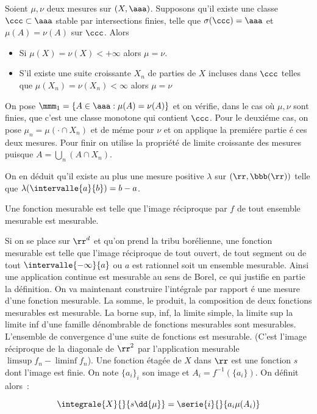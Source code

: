 \theoreme{} Soient $\mu,\nu$ deux mesures sur $(X,\aaa)$. Supposons qu'il existe une classe $\ccc\subset \aaa$ stable par
intersections finies, telle que $\sigma(\ccc) = \aaa$ et $\mu(A) = \nu(A)$ sur $\ccc$. Alors
\begin{itemize}
\item{} Si $\mu(X) = \nu(X)< +\infty$ alors $\mu = \nu$.
\item{} S'il existe une suite croissante $X_n$ de parties de $X$ incluses dans $\ccc$ telles que $\mu(X_n) = \nu(X_n)<\infty$ alors
$\mu = \nu$
\end{itemize}
\dem On pose $\mmm_1 = \lbrace A\in \aaa : \mu(A) = \nu(A)\rbrace$ et on vérifie, dans le cas o\`u $\mu,\nu$ sont finies, que c'est
une classe monotone qui contient $\ccc$. Pour le deuxiéme cas, on pose $\mu_n = \mu(\cdot\cap X_n)$ et de méme pour $\nu$ et on 
applique la premiére partie é ces deux mesures. Pour finir on utilise la propriété de limite croissante des mesures puisque $A = 
\bigcup_n (A\cap X_n)$.\par
On en déduit qu'il existe au plus une mesure positive $\lambda$ sur $(\rr, \bbb(\rr))$ telle que $\lambda(\intervalle{a}{b}) = b-a$.\par
{} Une fonction mesurable est telle que l'image réciproque par $f$ de tout ensemble
mesurable est mesurable.\par
Si on se place sur ${\rr}^{d}$ et qu'on prend la tribu borélienne, une fonction mesurable est telle que l'image
réciproque de tout ouvert, de tout segment ou de tout $\intervalle{-\infty}{a}$ ou $a$ est rationnel soit un 
ensemble mesurable. Ainsi une application continue est mesurable au sens de Borel, ce qui justifie en partie 
la définition. On va maintenant construire l'intégrale par rapport é une mesure d'une fonction mesurable.
\rmq La somme, le produit, la composition de deux fonctions mesurables est mesurable. La borne sup, inf, la limite
simple, la limite sup la limite inf d'une famille dénombrable de fonctions mesurables sont mesurables. L'ensemble
de convergence d'une suite de fonctions est mesurable. (C'est l'image réciproque de la diagonale de ${\rr}^2$ par 
l'application mesurable $\limsup f_n - \liminf f_n$).
 Une fonction étagée de $X$ dans $\rr$ est une fonction $s$ dont 
l'image est finie. On note $\lbrace{a_i\rbrace}_i$ son image et $A_i = f^{-1}(\lbrace{a_i\rbrace})$. On définit 
alors~:\par
$$\integrale{X}{}{s\dd{\mu}} = \serie{i}{}{a_i\mu(A_i)}$$\par
